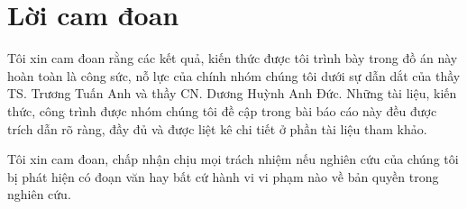 \section*{Lời cam đoan}

\hspace*{0.63cm}Tôi xin cam đoan rằng các kết quả, kiến thức được tôi trình bày trong đồ án này hoàn toàn là công sức, nỗ lực của chính nhóm chúng tôi dưới sự dẫn dắt của thầy TS. Trương Tuấn Anh và thầy CN. Dương Huỳnh Anh Đức. Những tài liệu, kiến thức, công trình được nhóm chúng tôi đề cập trong bài báo cáo này đều được trích dẫn rõ ràng, đầy đủ và được liệt kê chi tiết ở phần tài liệu tham khảo.

\hspace*{0.63cm}Tôi xin cam đoan, chấp nhận chịu mọi trách nhiệm nếu nghiên cứu của chúng tôi bị phát hiện có đoạn văn hay bất cứ hành vi vi phạm nào về bản quyền trong nghiên cứu.
\clearpage
